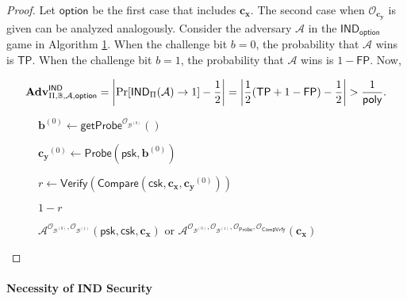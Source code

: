 \begin{proof}

Let $\textsf{option}$ be the first case that includes $\mathbf{c_x}$. The second case when $\mathcal{O}_{\mathbf{c_y}}$ is given can be analyzed analogously. Consider the adversary $\mathcal{A}$ in the $\textsf{IND}_{\textsf{option}}$ game in Algorithm \ref{alg:ind-tp-fp}. When the challenge bit $b = 0$, the probability that $\mathcal{A}$ wins is $\textsf{TP}$. When the challenge bit $b = 1$, the probability that $\mathcal{A}$ wins is $1 - \textsf{FP}$. Now, 

\[
	\mathbf{Adv}_{\Pi, \mathbb{B}, \mathcal{A}, \textsf{option}}^{\textsf{IND}} = \left| \Pr[ \textsf{IND}_\Pi(\mathcal{A}) \to 1 ] - \frac{1}{2} \right| = \left| \frac{1}{2} (\textsf{TP} + 1 - \textsf{FP}) - \frac{1}{2} \right| > \frac{1}{\mathsf{poly}}.
\]

\begin{figure}[h]
\centering

	\begin{minipage}[t]{0.85\textwidth}
	\begin{algorithm}[H]
	\caption{$\mathcal{A}^{\mathcal{O}_{\mathcal{B}^{(0)}}, \mathcal{O}_{\mathcal{B}^{(1)}}} (\textsf{psk}, \textsf{csk}, \mathbf{c_x})$ or $\mathcal{A}^{\mathcal{O}_{\mathcal{B}^{(0)}}, \mathcal{O}_{\mathcal{B}^{(1)}}, \mathcal{O}_{\textsf{Probe}}, \mathcal{O}_{\textsf{CompVrfy}} } (\mathbf{c_x})$}
	\label{alg:ind-tp-fp}
	\begin{algorithmic}[1]

		\State $\mathbf{b}^{(0)} \gets \textsf{getProbe}^{\mathcal{O}_{\mathcal{B}^{(0)}}}()$
		
		\State $\mathbf{c_y}^{(0)} \gets \textsf{Probe}(\textsf{psk}, \mathbf{b}^{(0)})$ 
		
		\State $r \gets \textsf{Verify}( \textsf{Compare}(\textsf{csk}, \mathbf{c_x}, \mathbf{c_y}^{(0)}) ) $ 
		
		\State \Return $1 - r$
	\end{algorithmic}
	\end{algorithm}
	\end{minipage}

\end{figure}

\end{proof}


\paragraph{Necessity of IND Security}

